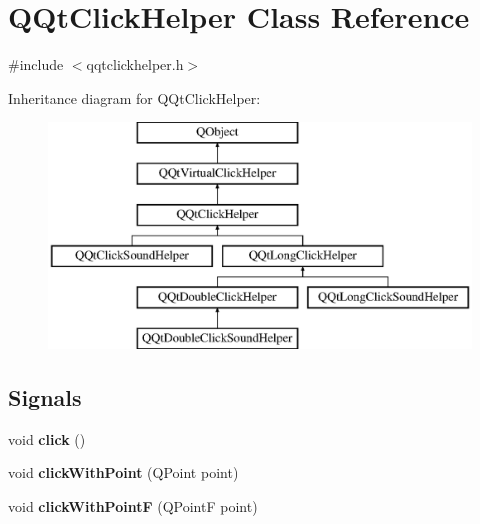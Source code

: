 \hypertarget{class_q_qt_click_helper}{}\section{Q\+Qt\+Click\+Helper Class Reference}
\label{class_q_qt_click_helper}


{\ttfamily \#include $<$qqtclickhelper.\+h$>$}

Inheritance diagram for Q\+Qt\+Click\+Helper\+:\begin{figure}[H]
\begin{center}
\leavevmode
\includegraphics[height=6.000000cm]{class_q_qt_click_helper}
\end{center}
\end{figure}
\subsection*{Signals}
\begin{DoxyCompactItemize}
\item 
\mbox{\label{class_q_qt_click_helper_aa5c0c7a3b731e3c57b2bfd975e9458dc}} 
void {\bfseries click} ()
\item 
\mbox{\label{class_q_qt_click_helper_a0e67a9b5c5ec735c763776d4f5f7587a}} 
void {\bfseries click\+With\+Point} (Q\+Point point)
\item 
\mbox{\label{class_q_qt_click_helper_a80f6e56208023174e4c7fcc437800903}} 
void {\bfseries click\+With\+PointF} (Q\+PointF point)
\end{DoxyCompactItemize}
